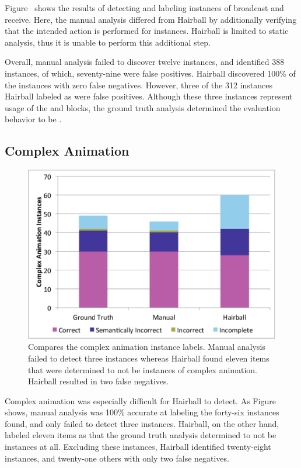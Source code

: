 Figure~ shows the results of detecting and
labeling instances of broadcast and receive. Here, the manual analysis differed
from Hairball by additionally verifying that the intended action is performed
for \correct{} instances. Hairball is limited to static analysis, thus it is
unable to perform this additional step.

Overall, manual analysis failed to discover twelve instances, and identified
388 \correct{} instances, of which, seventy-nine were false positives. Hairball
discovered 100\% of the instances with zero false negatives. However, three of
the 312 instances Hairball labeled as \correct{} were false positives. Although
these three instances represent \correct{} usage of the \broadcast{} and
\receive{} blocks, the ground truth analysis determined the evaluation behavior
to be \incor{}.



\subsection{Complex Animation}

\begin{figure}[!t]
\centering \includegraphics[trim=.3in .15in .3in .15in, clip,
  width=5.25in]{graphs/AutoAnimation.eps}
\caption{Compares the complex animation instance labels. Manual analysis failed
  to detect three instances whereas Hairball found eleven items that were
  determined to not be instances of complex animation. Hairball resulted in two
  false negatives.}
\end{figure}

Complex animation was especially difficult for Hairball to detect.  As
Figure~ shows, manual analysis was 100\% accurate at
labeling the forty-six instances found, and only failed to detect three
instances. Hairball, on the other hand, labeled eleven items as \incom{} that
the ground truth analysis determined to not be instances at all. Excluding
these instances, Hairball identified twenty-eight \correct{} instances, and
twenty-one others with only two false negatives.

